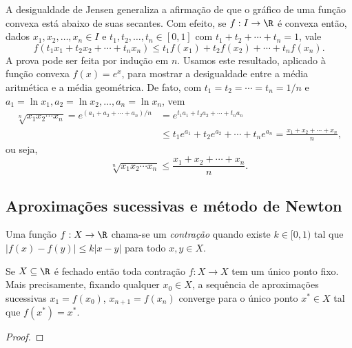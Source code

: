 \documentclass{article}
\begin{document}
A desigualdade de Jensen generaliza a afirmação de que o gráfico de uma função convexa está abaixo de suas secantes. Com efeito, se \(f: I \to \R\) é convexa então, dados \(x_1, x_2, \ldots, x_n \in I\) e \(t_1, t_2, \ldots, t_n \in [0,1]\) com \(t_1 + t_2 + \cdots + t_n = 1\), vale
\begin{equation}
    f(t_1 x_1 + t_2 x_2 + \cdots + t_n x_n) \leq t_1 f(x_1) + t_2 f(x_2) + \cdots + t_n f(x_n).
\end{equation}
A prova pode ser feita por indução em \(n\). Usamos este resultado, aplicado à função convexa \(f(x) = e^x\), para mostrar a desigualdade entre a média aritmética e a média geométrica. De fato, com \(t_1 = t_2 = \cdots = t_n = 1/n\) e \(a_1 = \ln x_1, a_2 = \ln x_2, \ldots, a_n = \ln x_n\), vem
\begin{align*}
    \sqrt[n]{x_1 x_2 \cdots x_n} = e^{(a_1 + a_2 + \cdots + a_n)/n} & = e^{t_1 a_1 + t_2 a_2 + \cdots + t_n a_n} \\
    & \leq t_1 e^{a_1} + t_2 e^{a_2} + \cdots + t_n e^{a_n} = \frac{x_1 + x_2 + \cdots + x_n}{n},
\end{align*}
ou seja,
\begin{equation}
    \sqrt[n]{x_1 x_2 \cdots x_n} \leq \frac{x_1 + x_2 + \cdots + x_n}{n}.
\end{equation}

\subsection{Aproximações sucessivas e método de Newton}

\begin{defn}
    Uma função \(f: X \to \R\) chama-se um \emph{contração} quando existe \(k \in [0,1)\) tal que \(\vert f(x)-f(y) \vert \leq k \vert x-y \vert\) para todo \(x, y \in X\).
\end{defn}

\begin{thm} 
    Se \(X \subseteq \R\) é fechado então toda contração \(f: X \to X\) tem um único ponto fixo. Mais precisamente, fixando qualquer \(x_0 \in X\), a sequência de aproximações sucessivas \(x_1 = f(x_0)\), \(x_{n+1} = f(x_n)\) converge para o único ponto \(x^* \in X\) tal que \(f(x^*) = x^*\).
\end{thm}

\begin{proof}
    
\end{proof}
\end{document}
